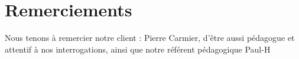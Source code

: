 \section{Remerciements}
Nous tenons à remercier notre client : Pierre Carmier, d'être aussi pédagogue et attentif à nos interrogations, ainsi que notre référent pédagogique Paul-H